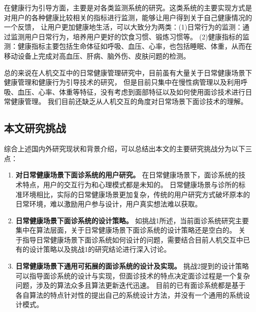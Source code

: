 在健康行为引导方面，主要是对各类监测系统的研究。这类系统的主要实现方式是对用户的各种健康比较相关的指标进行监测，能够让用户得到关于自己健康情况的一个反馈，
让用户更加健康地生活，可以大致分为两类：(1)日常行为的监测：通过监测用户日常行为，培养用户更好的饮食习惯、锻炼习惯等\cite{purpura2011fit4life, Inagawa2013A,bravata2007using,cordeiro2015barriers,lin2006fish, miller2014stepstream}。 
(2)健康指标的监测：健康指标主要包括生命体征如呼吸、血压、心率，也包括睡眠、体重，从而在移动设备上完成对高血压、肝病、脑外伤、皮肤问题的检测\cite{liang2020oralcam, wang2018seismo, mariakakis2017biliscreen}。

总的来说在人机交互中的日常健康管理研究中，目前虽有大量关于日常健康场景下健康管理和健康行为引导技术的研究，
但是目前只集中在慢性病管理以及利用呼吸、血压、心率、体重等特征，没有考虑到面部特征以及如何使用面诊技术进行日常健康管理。
我们目前还缺乏从人机交互的角度对日常场景下面诊技术的理解。



\subsection{本文研究挑战}
综合上述国内外研究现状和背景介绍，可以总结出本文的主要研究挑战分为以下三点：
\begin{enumerate}
    \item \textbf{对日常健康场景下面诊系统的用户研究。}
    在日常健康场景下，面诊系统的技术特点，用户的交互行为和心理模式都是未知的。
    日常健康场景与诊所的标准环境相比，实际的日常健康场景更加复杂，传统的用户研究方式破坏原本的日常环境，难以激励用户参与设计，用户真实想法难以获取。

\item \textbf{日常健康场景下面诊系统的设计策略。}
    如挑战1所述，当前面诊系统研究主要集中在算法层面，关于日常健康场景下面诊系统的设计策略还是空白的。
    关于指导日常健康场景下面诊系统如何设计的问题，需要结合目前人机交互中已有的设计策略以及挑战1的研究结论进行深入讨论。

\item \textbf{日常健康场景下通用可拓展的面诊系统的设计及实现。}
    挑战2提到的设计策略可以指导面诊系统的设计与实现，但面诊技术的特点决定面诊过程是一个复杂问题，涉及的算法众多且算法更新迭代迅速。
    目前的已有面诊系统都是基于各自算法的特点针对性的提出自己的系统设计方法，并没有一个通用的系统设计模式。
    
\end{enumerate}
